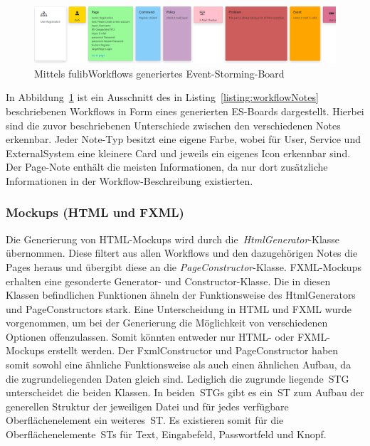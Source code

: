 \begin{figure}[h]
    \centering
    \includegraphics[width=1.0\textwidth]{images/3.1.4/board}
    \caption{Mittels fulibWorkflows generiertes Event-Storming-Board}
    \label{fig:generated-board}
\end{figure}


In Abbildung~\ref{fig:generated-board} ist ein Ausschnitt des in Listing~\ref{listing:workflowNotes} beschriebenen Workflows in
Form eines generierten \ac{ES}-Boards dargestellt.
Hierbei sind die zuvor beschriebenen Unterschiede zwischen den verschiedenen Notes erkennbar.
Jeder Note-Typ besitzt eine eigene Farbe, wobei für User, Service und ExternalSystem eine kleinere Card und jeweils ein
eigenes Icon erkennbar sind.
Der Page-Note enthält die meisten Informationen, da nur dort zusätzliche Informationen in der Workflow-Beschreibung existierten.

\subsubsection{Mockups (HTML und FXML)}\label{subsubsec:mockups-html/fxml}
Die Generierung von HTML-Mockups wird durch die~\textit{HtmlGenerator}-Klasse übernommen.
Diese filtert aus allen Workflows und den dazugehörigen Notes die Pages heraus und übergibt diese an die \textit{PageConstructor}-Klasse.
FXML-Mockups erhalten eine gesonderte Generator- und Constructor-Klasse.
Die in diesen Klassen befindlichen Funktionen ähneln der Funktionsweise des HtmlGenerators und PageConstructors stark.
Eine Unterscheidung in HTML und FXML wurde vorgenommen, um bei der Generierung die Möglichkeit von verschiedenen Optionen offenzulassen.
Somit könnten entweder nur HTML- oder FXML-Mockups erstellt werden.
Der FxmlConstructor und PageConstructor haben somit sowohl eine ähnliche Funktionsweise als auch einen ähnlichen Aufbau, da die zugrundeliegenden Daten gleich sind.
Lediglich die zugrunde liegende~\ac{STG} unterscheidet die beiden Klassen.
In beiden~\acp{STG} gibt es ein~\ac{ST} zum Aufbau der generellen Struktur der jeweiligen Datei und für jedes verfügbare Oberflächenelement ein weiteres~\ac{ST}.
Es existieren somit für die Oberflächenelemente~\acp{ST} für Text, Eingabefeld, Passwortfeld und Knopf.

